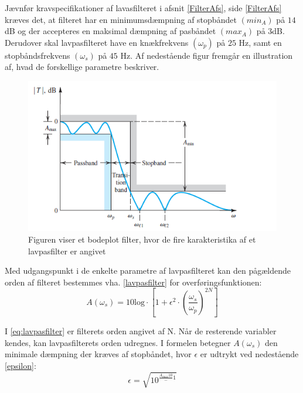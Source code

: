 Jævnfør kravspecifikationer af lavasfilteret i afsnit \ref{FilterAfs}, side \ref{FilterAfs} kræves det, at filteret har en minimumsdæmpning af stopbåndet $(min_{A})$ på $14$dB og der accepteres en maksimal dæmpning af pasbåndet $(max_{A})$ på $3$dB. Derudover skal lavpasfilteret have en knækfrekvens $(\omega _p)$ på $25$ Hz, samt en stopbåndsfrekvens $(\omega _s)$ på $45$ Hz. Af nedestående figur  fremgår en illustration af, hvad de forskellige parametre beskriver.

\begin{figure}[H]
	\centering
	\includegraphics[scale=0.8]{figures/cProblemloesning/Lavpasfilter_generisk.PNG}
	\caption{Figuren viser et bodeplot filter, hvor de fire karakteristika af et lavpasfilter er angivet}
	\label{fig:Lavpasfilter_generisk}
\end{figure}

\noindent Med udgangspunkt i de enkelte parametre af lavpasfilteret kan den pågældende orden af filteret bestemmes vha. \eqref{lavpasfilter} for overføringsfunktionen:
\begin{equation} \label{eq:lavpasfilter}
A(\omega_s) = 10 \text{log} \cdot \left[1 + \epsilon^2 \cdot (\frac{\omega _s}{\omega _p})^{2N}\right] 
\end{equation}

\noindent I \eqref{eq:lavpasfilter} er filterets orden angivet af N. Når de resterende variabler kendes, kan lavpasfilterets orden udregnes. I formelen betegner $A(\omega _s)$ den minimale dæmpning der kræves af stopbåndet, hvor $\epsilon$ er udtrykt ved nedestående \eqref{epsilon}:
\begin{equation}\label{eq:epsilon}
\epsilon = \sqrt{10^{\frac{A_{max}{10}} - 1}}
\end{equation}

